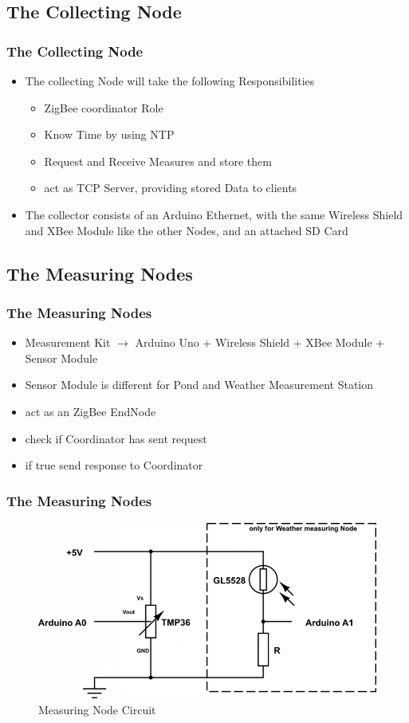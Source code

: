 \documentclass{beamer}
\begin{document}
\subsection{The Collecting Node}
\frame
{
	\frametitle{The Collecting Node}
	
	\begin{itemize}
	
	\item The collecting Node will take the following Responsibilities
	
	\begin{itemize}
	
	\item ZigBee coordinator Role
	\item Know Time by using NTP
	\item Request and Receive Measures and store them
	\item act as TCP Server, providing stored Data to clients
	
	\end{itemize}
	
	\item The collector consists of an Arduino Ethernet, with the same 
	Wireless Shield and XBee Module like the other Nodes, and an attached SD Card
	
	\end{itemize}

}

\subsection{The Measuring Nodes}

\frame
{
	\frametitle{The Measuring Nodes}
	\begin{itemize}
	\item Measurement Kit $\rightarrow$ Arduino Uno + Wireless Shield + XBee Module + 	Sensor Module	
	\item Sensor Module is different for Pond and Weather Measurement Station
	\item act as an ZigBee EndNode
	\item check if Coordinator has sent request
	\item if true send response to Coordinator	
	\end{itemize}
}

\frame
{
	\frametitle{The Measuring Nodes}
	\begin{figure}[h!]
  		\centering
    	\includegraphics[width=\textwidth]{../Images/Circuit.png}
		\caption{Measuring Node Circuit}
	\end{figure}
}
\end{document}
